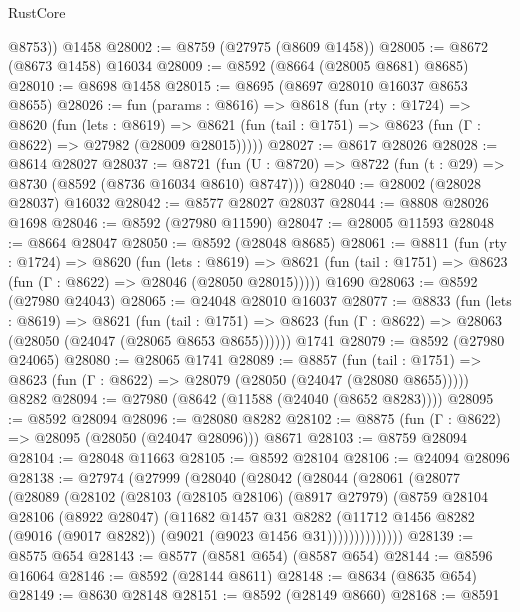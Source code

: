 \begin{lexlean}{RustCore}
\begin{coremodule}
        @8753))
    @1458
@28002 := @8759 (@27975 (@8609 @1458))
@28005 := @8672 (@8673 @1458) @16034
@28009 := @8592 (@8664 (@28005 @8681) @8685)
@28010 := @8698 @1458
@28015 := @8695 (@8697 @28010 @16037 @8653 @8655)
@28026 := fun (params : @8616) =>
  @8618
    (fun (rty : @1724) =>
    @8620
      (fun (lets : @8619) =>
      @8621 (fun (tail : @1751) => @8623 (fun (Γ : @8622) => @27982 (@28009 @28015)))))
@28027 := @8617 @28026
@28028 := @8614 @28027
@28037 := @8721
    (fun (U : @8720) => @8722 (fun (t : @29) => @8730 (@8592 (@8736 @16034 @8610) @8747)))
@28040 := @28002 (@28028 @28037) @16032
@28042 := @8577 @28027 @28037
@28044 := @8808 @28026 @1698
@28046 := @8592 (@27980 @11590)
@28047 := @28005 @11593
@28048 := @8664 @28047
@28050 := @8592 (@28048 @8685)
@28061 := @8811
    (fun (rty : @1724) =>
    @8620
      (fun (lets : @8619) =>
      @8621 (fun (tail : @1751) => @8623 (fun (Γ : @8622) => @28046 (@28050 @28015)))))
    @1690
@28063 := @8592 (@27980 @24043)
@28065 := @24048 @28010 @16037
@28077 := @8833
    (fun (lets : @8619) =>
    @8621
      (fun (tail : @1751) =>
      @8623 (fun (Γ : @8622) => @28063 (@28050 (@24047 (@28065 @8653 @8655))))))
    @1741
@28079 := @8592 (@27980 @24065)
@28080 := @28065 @1741
@28089 := @8857
    (fun (tail : @1751) => @8623 (fun (Γ : @8622) => @28079 (@28050 (@24047 (@28080 @8655)))))
    @8282
@28094 := @27980 (@8642 (@11588 (@24040 (@8652 @8283))))
@28095 := @8592 @28094
@28096 := @28080 @8282
@28102 := @8875 (fun (Γ : @8622) => @28095 (@28050 (@24047 @28096))) @8671
@28103 := @8759 @28094
@28104 := @28048 @11663
@28105 := @8592 @28104
@28106 := @24094 @28096
@28138 := @27974
    (@27999
      (@28040
        (@28042
          (@28044
            (@28061
              (@28077
                (@28089
                  (@28102
                    (@28103
                      (@28105 @28106)
                      (@8917 @27979)
                      (@8759
                        @28104
                        @28106
                        (@8922 @28047)
                        (@11682
                          @1457
                          @31
                          @8282
                          (@11712
                            @1456
                            @8282
                            (@9016 (@9017 @8282))
                            (@9021 (@9023 @1456 @31))))))))))))))
@28139 := @8575 @654
@28143 := @8577 (@8581 @654) (@8587 @654)
@28144 := @8596 @16064
@28146 := @8592 (@28144 @8611)
@28148 := @8634 (@8635 @654)
@28149 := @8630 @28148
@28151 := @8592 (@28149 @8660)
@28168 := @8591

\end{coremodule}
\end{lexlean}
